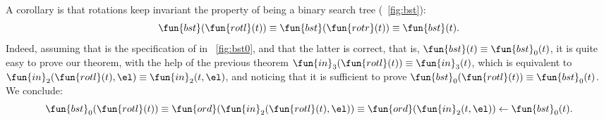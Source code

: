 A corollary is that rotations keep invariant the property of being a
binary search tree (\fig~\vref{fig:bst}):
\begin{equation*}
\abovedisplayskip=5pt
\belowdisplayskip=5pt
\fun{bst}(\fun{rotl}(t)) \equiv \fun{bst}(\fun{rotr}(t)) \equiv \fun{bst}(t).
\end{equation*}
Indeed, assuming that  is the specification of
 in \fig~\vref{fig:bst0}, and that the latter is
correct, that is, \(\fun{bst}(t) \equiv \fun{bst}_0(t)\), it is quite
easy to prove our theorem, with the help of the previous theorem
\(\fun{in}_3(\fun{rotl}(t)) \equiv \fun{in}_3(t)\), which is
equivalent to \(\fun{in}_2(\fun{rotl}(t),\el) \equiv
\fun{in}_2(t,\el)\), and noticing that it is sufficient to prove
\(\fun{bst}_0(\fun{rotl}(t)) \equiv \fun{bst}_0(t)\). We conclude:
\begin{equation*}
\fun{bst}_0(\fun{rotl}(t))
\equiv \fun{ord}(\fun{in}_2(\fun{rotl}(t),\el))
\equiv \fun{ord}(\fun{in}_2(t,\el))
\leftarrow \fun{bst}_0(t).
\end{equation*}

